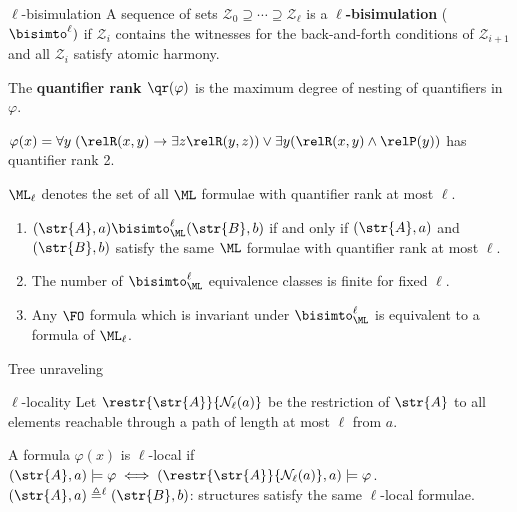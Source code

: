 \documentclass[169]{beamer}
\begin{document}
\begin{frame}[label=current]{$\ell$-bisimulation}
  A sequence of sets $\mathcal{Z}_{0} \supseteq \cdots \supseteq \mathcal{Z}_{\ell}$ is a \textbf{$\ell$-bisimulation} ($\bisimto^{\ell})$ if $\mathcal{Z}_{i}$ contains the witnesses for the back-and-forth conditions of $\mathcal{Z}_{i+1}$ and all $\mathcal{Z}_{i}$ satisfy atomic harmony.

  \vspace{1em}

  \begin{overprint}
      The \textbf{quantifier rank $\qr(\varphi)$} is the maximum degree of nesting of quantifiers in $\varphi$.

      \begin{example}
        $\varphi(x) = \forall{y}\; (\relR(x,y) \to \exists{z} \relR(y,z)) \lor \exists{y}(\relR(x,y) \land \relP(y))$ has quantifier rank 2.
      \end{example}

      \vspace{1em}

      $\ML_{\ell}$ denotes the set of all $\ML$ formulae with quantifier rank at most $\ell$.
      \begin{enumerate}
        \item $(\str{A}, a) \bisimto_{\ML}^{\ell} (\str{B}, b)$ if and only if $(\str{A}, a)$ and $(\str{B}, b)$ satisfy the same $\ML$ formulae with quantifier rank at most $\ell$.
        \item The number of $\bisimto_{\ML}^{\ell}$ equivalence classes is finite for fixed $\ell$.
        \item Any $\FO$ formula which is invariant under $\bisimto_{\ML}^{\ell}$ is equivalent to a formula of $\ML_{\ell}$.
      \end{enumerate}
  \end{overprint}
\end{frame}

\begin{frame}[label=current]{Tree unraveling}
  
\end{frame}

\begin{frame}[label=current]{$\ell$-locality}
  Let $\restr{\str{A}}{\mathcal{N}_{\ell}(a)}$ be the restriction of $\str{A}$ to all elements reachable through a path of length at most $\ell$ from $a$.%
  \vspace{-0.5em}
  \begin{center}
  
  \end{center}
  \vspace{-1em}
  A formula $\varphi(x)$ is $\ell$-local if $(\str{A}, a) \models \varphi \iff (\restr{\str{A}}{\mathcal{N}_{\ell}(a)}, a) \models \varphi$.\\[1em]
  $(\str{A}, a) \triangleq^{\ell} (\str{B}, b)$: structures satisfy the same $\ell$-local formulae.
\end{frame}
\end{document}
